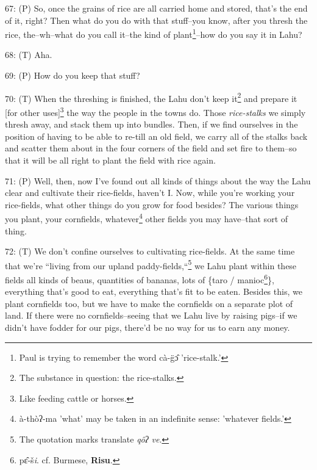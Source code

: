 67: (P) So, once the grains of rice are all carried home and stored, that's the
end of it, right? Then what do you do with that stuff--you know, after you thresh
the rice, the--wh--what do you call it--the kind of plant\footnote{Paul is trying to remember the word cà-g̈ɔ̂ 'rice-stalk.'}--how do you say it
in Lahu?

68: (T) Aha.

69: (P) How do you keep that stuff?

70: (T) When the threshing is finished, the Lahu don't keep it\footnote{The substance in question: the rice-stalks.} and prepare
it [for other uses]\footnote{Like feeding cattle or horses.} the way the people in the towns do. Those \textit{rice-stalks}
we simply thresh away, and stack them up into bundles. Then, if we find ourselves
in the position of having to be able to re-till an old field, we carry all of the
stalks back and scatter them about in the four corners of the field and set fire
to them--so that it will be all right to plant the field with rice again.

71: (P) Well, then, now I've found out all kinds of things about the way the Lahu
clear and cultivate their rice-fields, haven't I. Now, while you're working your
rice-fields, what other things do you grow for food besides? The various things
you plant, your cornfields, whatever\footnote{à-thòʔ-ma 'what' may be taken in an indefinite sense: 'whatever fields.'} other fields you may have--that sort of
thing.

72: (T) We don't confine ourselves to cultivating rice-fields. At the same time
that we're ``living from our upland paddy-fields,``\footnote{The quotation marks translate\textit{ qôʔ ve}.} we Lahu
plant within these fields all kinds of beaus, quantities of bananas, lots of \{taro
/ manioc\footnote{pɛ̂-š\emph{i}. cf. Burmese, \textbf{Risu}.}\}, everything that's good to eat, everything that's fit to be eaten.
Besides this, we plant cornfields too, but we have to make the cornfields on a
separate plot of land. If there were no cornfields--seeing that we Lahu live by
raising pigs--if we didn't have fodder for our pigs, there'd be no way for us to
earn any money.


